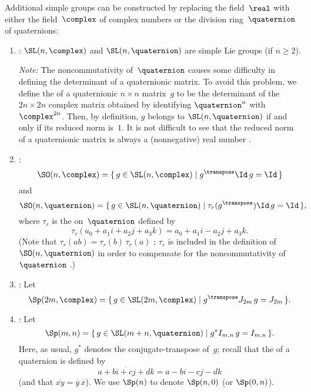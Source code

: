 \begin{eg} \label{classical-orthogonal}
 Additional simple groups can be constructed by replacing
the field~$\real$ with either the field~$\complex$ of complex
numbers or the division ring~$\quaternion$ of quaternions:
 \begin{enumerate}

 \item {}: $\SL(n,\complex)$ and
$\SL(n,\quaternion)$ are simple Lie groups (if $n \ge 2$).

 {\it Note:} The noncommutativity of~$\quaternion$ causes
some difficulty in defining the determinant of a
quaternionic matrix. To avoid this problem, we define the
 of a quaternionic $n \times n$
matrix~$g$ to be the determinant of the $2n \times 2n$
complex matrix obtained by identifying $\quaternion^n$
with~$\complex^{2n}$. Then, by definition, $g$ belongs to
$\SL(n,\quaternion)$ if and only if its reduced norm
is~$1$. It is not difficult to see that the reduced norm of a
quaternionic matrix is always a (nonnegative) real number .

 \item \label{classical-orthogonal-SOCH}
 : 
 $$\SO(n,\complex) 
 = \{\, g \in \SL(n,\complex) \mid g^\transpose \Id\, g = \Id
\,\} $$
 and
 $$ \SO(n,\quaternion)
 = \{\, g \in \SL(n,\quaternion) \mid \tau_r(g^\transpose)
\Id\, g = \Id \,\} ,$$
 where $\tau_r$ is the  on~$\quaternion$
defined by
 $$ \tau_r(a_0 + a_1 i + a_2 j + a_3 k)
 =  a_0 + a_1 i - a_2 j + a_3 k .$$
 (Note that $\tau_r(ab) = \tau_r(b) \, \tau_r(a)$
; $\tau_r$ is included in the
definition of $\SO(n,\quaternion)$ in order to compensate
for the noncommutativity of~$\quaternion$
.)

 \item {}:
Let
 $$\Sp(2m,\complex) 
 = \{\, g \in \SL(2m,\complex)
 \mid g^\transpose J_{2m} \, g = J_{2m} \,\} .$$

 \item {}: Let
 $$\Sp(m,n)
 = \{\, g \in \SL(m+n,\quaternion)
 \mid g^* I_{m,n} \, g = I_{m,n} \,\}
 .$$
 Here, as usual, $g^*$ denotes the conjugate-transpose of~$g$; recall that the  of a quaternion is defined by%
 	$$ \overline{a + bi + cj + dk} = a - bi - cj - dk $$
(and that $\overline{xy} = \overline{y} \, \overline{x}$).
  We use $\Sp(n)$ to denote $\Sp(n,0)$ (or $\Sp(0,n)$).
 \end{enumerate}
 \end{eg}

